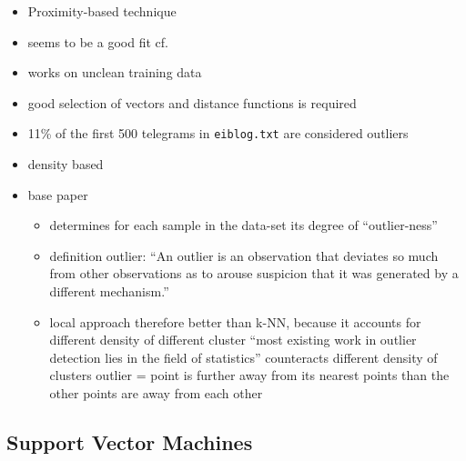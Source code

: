 	\begin{itemize}
		\item Proximity-based technique
		\item seems to be a good fit cf. \textcite{Lazarevic2003}
		\item works on unclean training data
		\item good selection of vectors and distance functions is required
		\item 11\% of the first 500 telegrams in \verb|eiblog.txt| are considered outliers
		\item density based
		\item base paper \textcite{Breunig2000}
			\begin{itemize}
				\item determines for each sample in the data-set its degree of \enquote{outlier-ness} \parencite{Breunig2000}
				\item definition outlier: \enquote{An outlier is an observation that deviates so much from other
					observations as to arouse suspicion that it was generated by a
					different mechanism.} \parencite{Hawkins1980}
				\item local approach
					\subitem therefore better than k-NN, because it accounts for different density of different cluster
					\subitem \enquote{most existing work in outlier detection lies in the field of statistics} \parencite{Breunig2000}
					\subitem counteracts different density of clusters \parencite{Breunig2000}
					\subitem outlier = point is further away from its nearest points than the other points are away from each other \parencite{Breunig2000}
			\end{itemize}
	\end{itemize}
	
	\subsection{Support Vector Machines}
	\label{sec:background:network:novelty:svm}
	
